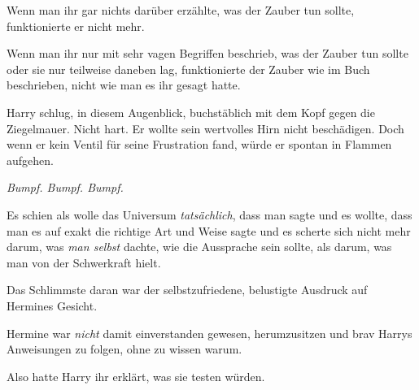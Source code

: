 Wenn man ihr gar nichts darüber erzählte, was der Zauber tun sollte, funktionierte er nicht mehr.

Wenn man ihr nur mit sehr vagen Begriffen beschrieb, was der Zauber tun sollte oder sie nur teilweise daneben lag, funktionierte der Zauber wie im Buch beschrieben, nicht wie man es ihr gesagt hatte.

Harry schlug, in diesem Augenblick, buchstäblich mit dem Kopf gegen die Ziegelmauer. Nicht hart. Er wollte sein wertvolles Hirn nicht beschädigen. Doch wenn er kein Ventil für seine Frustration fand, würde er spontan in Flammen aufgehen.

\emph{Bumpf. Bumpf. Bumpf.}

Es schien als wolle das Universum \emph{tatsächlich}, dass man  sagte und es wollte, dass man es auf exakt die richtige Art und Weise sagte und es scherte sich nicht mehr darum, was \emph{man selbst} dachte, wie die Aussprache sein sollte, als darum, was man von der Schwerkraft hielt.

\emph{}

Das Schlimmste daran war der selbstzufriedene, belustigte Ausdruck auf Hermines Gesicht.

Hermine war \emph{nicht} damit einverstanden gewesen, herumzusitzen und brav Harrys Anweisungen zu folgen, ohne zu wissen warum.

Also hatte Harry ihr erklärt, was sie testen würden.

